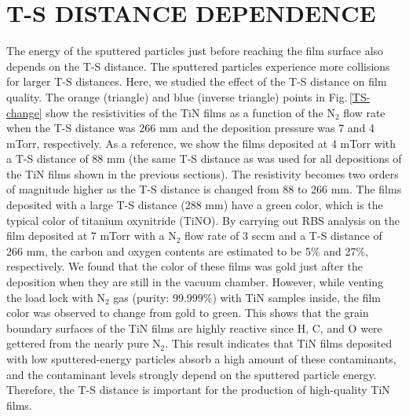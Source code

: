 \documentclass{report}
\begin{document}
\section{T-S DISTANCE DEPENDENCE}
\label{T-S DISTANCE DEPENDENCE}
The energy of the sputtered particles just before reaching the film surface also depends on the T-S distance. The sputtered particles experience more collisions for larger T-S distances. Here, we studied the effect of the T-S distance on film quality. The orange (triangle) and blue (inverse triangle) points in Fig.\,\ref{TS-change} show the resistivities of the TiN films as a function of the N$_{2}$ flow rate when the T-S distance was 266 mm and the deposition pressure was 7 and 4 mTorr, respectively. As a reference, we show the films deposited at 4 mTorr with a T-S distance of 88 mm (the same T-S distance as was used for all depositions of the TiN films shown in the previous sections). The resistivity becomes two orders of magnitude higher as the T-S distance is changed from 88 to 266 mm. The films deposited with a large T-S distance (288 mm) have a green color, which is the typical color of titanium oxynitride (TiNO). By carrying out RBS analysis on the film deposited at 7 mTorr with a N$_{2}$ flow rate of 3 sccm and a T-S distance of 266 mm, the carbon and oxygen contents are estimated to be 5\% and 27\%, respectively. We found that the color of these films was gold just after the deposition when they are still in the vacuum chamber. However, while venting the load lock with N$_{2}$ gas (purity: 99.999\%) with TiN samples inside, the film color was observed to change from gold to green.  This shows that the grain boundary surfaces of the TiN films are highly reactive since H, C, and O were gettered from the nearly pure N$_{2}$. This result indicates that TiN films deposited with low sputtered-energy particles absorb a high amount of these contaminants, and the contaminant levels strongly depend on the sputtered particle energy. Therefore, the T-S distance is important for the production of high-quality TiN films.\cite{T-SComment}
\end{document}
